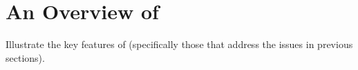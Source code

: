 \section{An Overview of \name}

Illustrate the key features of \name (specifically those that address the issues in previous sections). 
